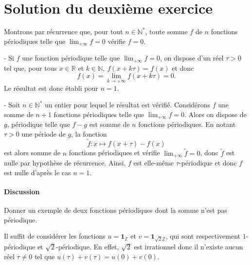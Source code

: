\section{Solution du deuxième exercice}

Montrons par récurrence que, pour tout $n \in \mathbb N^*$, toute somme $f$ de $n$
fonctions périodiques telle que $\lim_{+\infty} f = 0$ vérifie $f = 0$.

-  Si $f$ une fonction périodique telle que $\lim_{+\infty} f = 0$, on
dispose d'un réel $\tau > 0$ tel que, pour tous $x \in \mathbb R$ et $k \in
\mathbb N,\ f(x+k\tau) = f(x)$ et donc
$$
f(x) = \lim_{k\to +\infty} f(x + k\tau) = 0.
$$
Le résultat est donc établi pour $n = 1$.

- Soit $n \in \mathbb N^*$ un entier pour lequel le résultat est
  vérifié.
  Considérons $f$ une somme de $n+1$ fonctions périodiques
  telle que $\lim_{+\infty} f = 0$.  Alors on dispose de $g$,
  périodique telle que $f- g$ est somme de $n$ fonctions
  périodiques.  En notant $\tau > 0$ une période de $g$, la fonction
    $$
        \tilde f : x\longmapsto f(x+\tau) - f(x)
    $$
  est alors somme de $n$ fonctions périodiques et vérifie
  $\lim_{+\infty} \tilde f =0$,
  donc $\tilde f$ est nulle par hypothèse de récurrence. Ainsi, $f$ est
  elle-même $\tau$-périodique et donc $f$ est nulle d'après le cas $n = 1$.

\paragraph{Discussion}

Donner un exemple de deux fonctions périodiques dont la somme
n'est pas périodique.

Il suffit de considérer les fonctions $u = \mathbf 1_{\mathbb Z}$ et $v = \mathbf
1_{\sqrt 2 \mathbb Z}$, qui sont respectivement $1$-périodique et $\sqrt 2$-périodique. En effet, $\sqrt 2$ est irrationnel donc il n'existe aucun réel $\tau \neq 0$ tel que
$u(\tau) + v(\tau) = u(0) + v(0)$.

